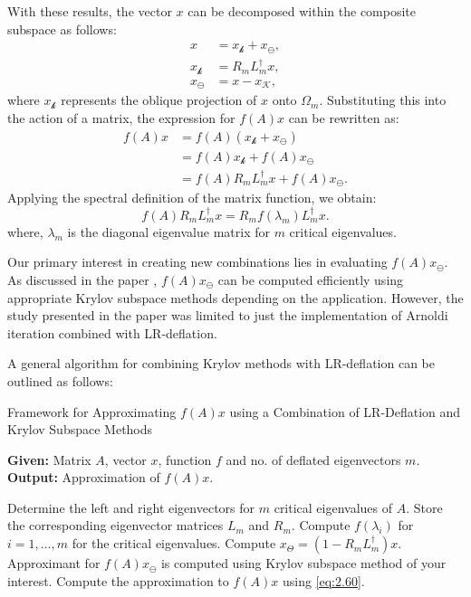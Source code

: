 With these results, the vector $x$ can be decomposed within the composite subspace as follows:
\[
\begin{aligned}
    x &= x_{\mathcal{k}} + x_{\ominus}, \\
    x_{\mathcal{k}} &= R_{m} L_{m}^{\dagger} x, \\
    x_{\ominus} &= x - x_{\mathcal{K}},
\end{aligned}
\]
where $x_{\mathcal{k}}$ represents the oblique projection of $x$ onto $\Omega_{m}$. Substituting this into the action of a matrix, the expression for $f(A)x$ can be rewritten as:
\[
\begin{aligned}
    f(A)x &= f(A)(x_{\mathcal{k}} + x_{\ominus}) \\
          &= f(A)x_{\mathcal{k}} + f(A)x_{\ominus} \\
          &= f(A)R_{m}L_{m}^{\dagger}x + f(A)x_{\ominus}.
\end{aligned}
\]
Applying the spectral definition of the matrix function, we obtain:
\[
    f(A)R_{m}L_{m}^{\dagger}x = R_{m}f(\lambda_{m})L_{m}^{\dagger}x.
\]
where, $\lambda_m$ is the diagonal eigenvalue matrix for $m$ critical eigenvalues.

Our primary interest in creating new combinations lies in evaluating $f(A)x_{\ominus}$. As discussed in the paper \cite{11}, $f(A)x_{\ominus}$ can be computed efficiently using appropriate Krylov subspace methods depending on the application. However, the study presented in the paper \cite{11} was limited to just the implementation of Arnoldi iteration combined with LR-deflation.

A general algorithm for combining Krylov methods with LR-deflation can be outlined as follows:

\begin{algorithm}[H]
    \caption{Framework for Approximating $f(A)x$ using a Combination of LR-Deflation and Krylov Subspace Methods}
    \label{alg:lr_combo}
    \textbf{Given:} Matrix $A$, vector $x$, function $f$ and no. of deflated eigenvectors $m$.\\
    \textbf{Output:} Approximation of $f(A)x$.
    \begin{algorithmic}[1]
        \STATE Determine the left and right eigenvectors for $m$ critical eigenvalues of $A$. Store the corresponding eigenvector matrices $L_m$ and $R_m$.
        \STATE Compute $f(\lambda_i)$ for $i = 1, \dots, m$ for the critical eigenvalues.
        \STATE Compute $x_{\Theta} = \left(1 - R_m L_m^{\dagger} \right) x$.
        \STATE Approximant for $f(A)x_{\ominus}$ is computed using Krylov subspace method of your interest.
        \STATE Compute the approximation to $f(A)x$ using \eqref{eq:2.60}.
    \end{algorithmic}
\end{algorithm}

